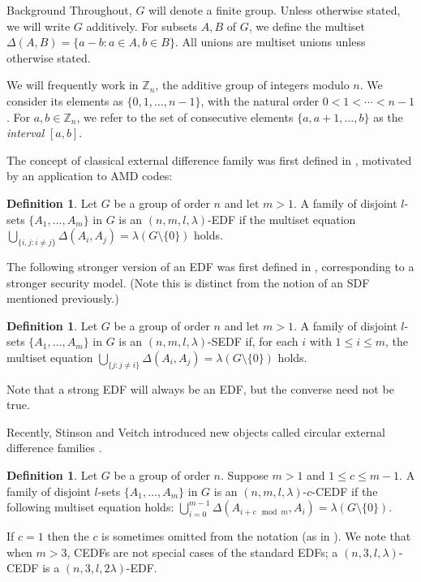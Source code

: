 \documentclass[12pt, a4paper]{article}
\theoremstyle{definition}
\newtheorem{definition}[theorem]{Definition}
\begin{document}
\begin{section}{Background}\label{sec:background}
Throughout, $G$ will denote a finite group.  Unless otherwise stated, we will write $G$ additively. For subsets $A, B$ of $G$, we define the multiset $\Delta(A,B)=\{a-b:a\in A, b \in B\}$.  All unions are multiset unions unless otherwise stated.

We will frequently work in $\mathbb{Z}_n$, the additive group of integers modulo $n$. We consider its elements as $\{0,1,\ldots, n-1\}$, with the natural order $0<1< \cdots < n-1$.  For $a, b \in \mathbb{Z}_n$, we refer to the set of consecutive elements $\{a,a+1,\ldots,b\}$ as the \emph{interval} $[a,b]$.  

The concept of classical external difference family was first defined in \cite{Oga}, motivated by an application to AMD codes:

\begin{definition}\label{def:EDF}
Let $G$ be a group of order $n$ and let $m>1$.  A family of disjoint $l$-sets $\{A_1, \ldots, A_m\}$ in $G$ is an $(n,m,l,\lambda)$-EDF if the multiset equation
$ \bigcup_{\{i,j: i \neq j\}} \Delta(A_i,A_j)= \lambda(G \setminus \{0\})$ holds.
\end{definition}

The following stronger version of an EDF was first defined in \cite{PatSti1}, corresponding to a stronger security model. (Note this is distinct from the notion of an SDF mentioned previously.)
\begin{definition}\label{def:SEDF}
Let $G$ be a group of order $n$ and let $m>1$.  A family of disjoint $l$-sets $\{A_1, \ldots, A_m\}$ in $G$ is an $(n,m,l,\lambda)$-SEDF if, for each $i$ with $1 \leq i \leq m$, the multiset equation
$ \bigcup_{\{j: j \neq i\}} \Delta(A_i,A_j)= \lambda(G \setminus \{0\})$ holds.
\end{definition} 
Note that a strong EDF will always be an EDF, but the converse need not be true.

Recently, Stinson and Veitch introduced new objects called circular external difference families \cite{VeiSti}. 

\begin{definition}
Let $G$ be a group of order $n$. Suppose $m>1$ and $1 \leq c \leq m-1$.   A family of disjoint $l$-sets $\{A_1, \ldots, A_m\}$ in $G$ is an $(n, m, l,\lambda)$-$c$-CEDF if the following multiset equation holds:
$ \bigcup_{i=0}^{m-1} \Delta(A_{i+c \mod m}, A_i)=\lambda (G \setminus \{0\})$.
\end{definition}
If $c=1$ then the $c$ is sometimes omitted from the notation (as in \cite{PatSti2}).  We note that when $m>3$, CEDFs are not special cases of the standard EDFs; a $(n,3,l,\lambda)$-CEDF is a $(n,3,l,2\lambda)$-EDF.


\end{section}
\end{document}
